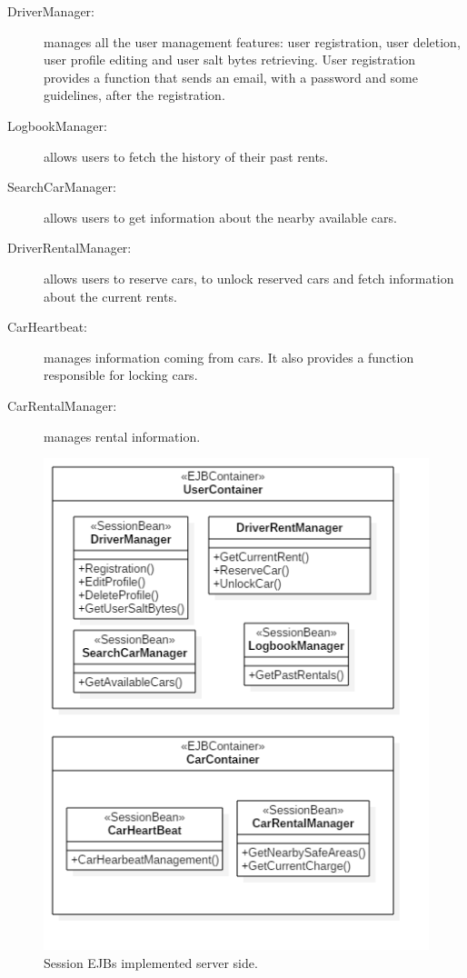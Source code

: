\begin{description}
	\item[DriverManager:] manages all the user management features: user registration, user deletion, user profile editing and user salt bytes retrieving.
User registration provides a function that sends an email, with a password and some guidelines, after the registration.
	\item[LogbookManager:] allows users to fetch the history of their past rents.
	\item[SearchCarManager:] allows users to get information about the nearby available cars.
	\item[DriverRentalManager:] allows users to reserve cars, to unlock reserved cars and fetch information about the current rents.
	\item[CarHeartbeat:] manages information coming from cars. It also provides a function responsible for locking cars.
	\item[CarRentalManager:] manages rental information.
\end{description}

\begin{figure}[H]
	\centering
	\includegraphics[width=\textwidth, keepaspectratio]{diagrams/SEJBs.png}
	\caption{Session EJBs implemented server side.}
	\label {fig:session-beans}
\end{figure}

